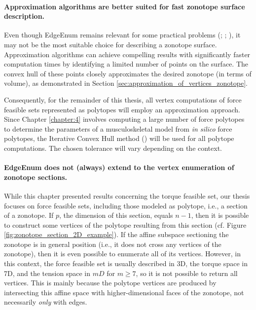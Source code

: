 \paragraph*{Approximation algorithms are better suited for fast zonotope surface description.} 
Even though EdgeEnum remains relevant for some practical problems (\cite{guCounterfactualIdentificationLatent2022}; \cite{fukudaZonotopeConstructionMinkowski2004a}; \cite{guibasZonotopesBoundingVolumes}), it may not be the most suitable choice for describing a zonotope surface. Approximation algorithms can achieve compelling results with significantly faster computation times by identifying a limited number of points on the surface. The convex hull of these points closely approximates the desired zonotope (in terms of volume), as demonstrated in Section \ref{sec:approximation_of_vertices_zonotope}.

Consequently, for the remainder of this thesis, all vertex computations of force feasible sets represented as polytopes will employ an approximation approach. Since Chapter \ref{chapter:4} involves computing a large number of force polytopes to determine the parameters of a musculoskeletal model from \emph{in silico} force polytopes, the Iterative Convex Hull method (\cite{skuricOnLineFeasibleWrench2022}) will be used for all polytope computations. The chosen tolerance will vary depending on the context.

\paragraph*{EdgeEnum does not (always) extend to the vertex enumeration of zonotope sections.} While this chapter presented results concerning the torque feasible set, our thesis focuses on force feasible sets, including those modeled as polytope, i.e., a section of a zonotope. If $p$, the dimension of this section, equals $n-1$, then it is possible to construct some vertices of the polytope resulting from this section (cf. Figure \ref{fig:zonotope_section_2D_example}). If the affine subspace sectioning the zonotope is in general position (i.e., it does not cross any vertices of the zonotope), then it is even possible to enumerate all of its vertices. However, in this context, the force feasible set is usually described in 3D, the torque space in 7D, and the tension space in $mD$ for $m\geq 7$, so it is not possible to return all vertices. This is mainly because the polytope vertices are produced by intersecting this affine space with higher-dimensional faces of the zonotope, not necessarily \emph{only} with edges.

